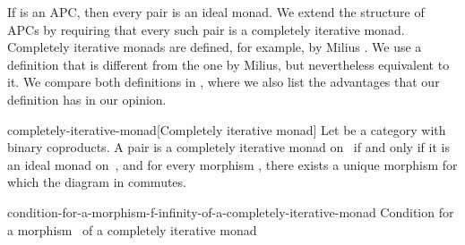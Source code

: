 \documentclass[copyright,creativecommons]{eptcs}
\newcommand{\edges}{\AtBeginMath\scriptstyle}
\begin{document}

If  is an APC, then every pair  is an ideal monad. We extend the structure of APCs by requiring
that every such pair is a completely iterative monad. Completely iterative
monads are defined, for example, by Milius
\cite[Definition~5.5]{milius:ic-196-1}. We use a definition that is different
from the one by Milius, but nevertheless equivalent to it. We compare both
definitions in
, where we
also list the advantages that our definition has in our opinion.

\begin{extdefinition}{completely-iterative-monad}[Completely iterative monad]
Let  be a category with binary coproducts. A pair  is a completely
iterative monad on~ if and only if it is an ideal monad on~, and for every
morphism , there exists a unique morphism  for
which the diagram in
commutes.
\end{extdefinition}
\begin{extfigure}{condition-for-a-morphism-f-infinity-of-a-completely-iterative-monad}
                 {Condition for a morphism~ of a completely iterative monad}


\end{extfigure}
\end{document}
